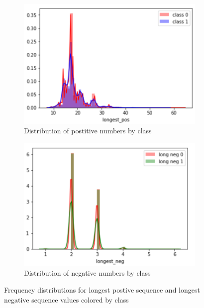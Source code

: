 \documentclass[11pt,letterpaper]{article}
\begin{document}
\begin{figure}[h!]
    \centering
    \begin{subfigure}[]{.4\textwidth}
        \includegraphics[width=\textwidth]{long_pos_dist.png}
        \caption{Distribution of postitive numbers by class}
        \label{fig:pos_dist}
    \end{subfigure}
    \begin{subfigure}[]{.4\textwidth}
        \includegraphics[width=\textwidth]{long_neg_dist.png}
        \caption{Distribution of negative numbers by class}
        \label{fig:neg_dist}
    \end{subfigure}
    \caption{Frequency distributions for longest postive sequence and longest
negative sequence values colored by class}
    \label{fig:count_dist}
\end{figure}
\end{document}
